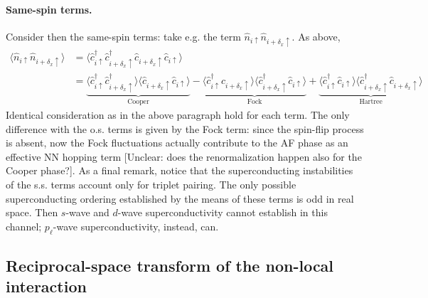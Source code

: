\paragraph{Same-spin terms.} Consider then the same-spin terms: take e.g. the term $\hat n_{i\uparrow} \hat n_{i + \delta_x \uparrow}$. As above,
\[
\begin{aligned}
	\langle 
	\hat n_{i\uparrow} \hat n_{i + \delta_x \uparrow}
	\rangle &= \langle 
	\hat c_{i\uparrow}^\dagger \hat c_{i + \delta_x \uparrow}^\dagger \hat c_{i + \delta_x \uparrow} \hat c_{i\uparrow} 
	\rangle \\
	&= 
	\underbrace{
		\langle 
		\hat c_{i\uparrow}^\dagger \hat c_{i + \delta_x \uparrow}^\dagger
		\rangle \langle	
		\hat c_{i + \delta_x \uparrow} \hat c_{i\uparrow} 
		\rangle 
	}_{\text{Cooper}}
	- 
	\underbrace{
		\langle 
		\hat c_{i\uparrow}^\dagger \hat c_{i + \delta_x \uparrow}
		\rangle \langle	
		\hat c_{i + \delta_x \uparrow}^\dagger \hat c_{i\uparrow} 
		\rangle 
	}_{\text{Fock}}
	+ 
	\underbrace{
		\langle 
		\hat c_{i\uparrow}^\dagger \hat c_{i\uparrow}
		\rangle \langle	
		\hat c_{i + \delta_x \uparrow}^\dagger \hat c_{i + \delta_x \uparrow} 
		\rangle
	}_{\text{Hartree}}
\end{aligned}
\]
Identical consideration as in the above paragraph hold for each term. The only difference with the o.s. terms is given by the Fock term: since the spin-flip process is absent, now the Fock fluctuations actually contribute to the AF phase as an effective NN hopping term {\color{tabred}[Unclear: does the renormalization happen also for the Cooper phase?]}. As a final remark, notice that the superconducting instabilities of the s.s. terms account only for triplet pairing. The only possible superconducting ordering established by the means of these terms is odd in real space. Then $s$-wave and $d$-wave superconductivity cannot establish in this channel; $p_\ell$-wave superconductivity, instead, can.

\subsection{Reciprocal-space transform of the non-local interaction}

